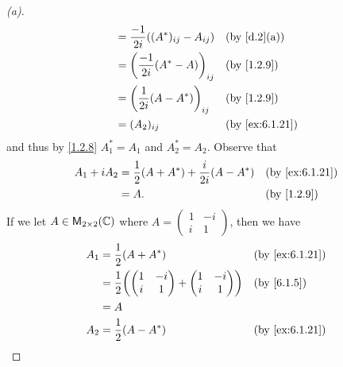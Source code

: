 \begin{proof}[(a)]
\begin{align*}
                                                      & = \frac{-1}{2i} ((A^*)_{i j} - A_{i j})               &  & \text{(by \cref{d.2}(a))}    \\
                                                      & = \pa{\frac{-1}{2i} (A^* - A)}_{i j}                  &  & \text{(by \cref{1.2.9})}     \\
                                                      & = \pa{\frac{1}{2i} (A - A^*)}_{i j}                   &  & \text{(by \cref{1.2.9})}     \\
                                                      & = (A_2)_{i j}                                         &  & \text{(by \cref{ex:6.1.21})}
  \end{align*}
  and thus by \cref{1.2.8} \(A_1^* = A_1\) and \(A_2^* = A_2\).
  Observe that
  \begin{align*}
    A_1 + i A_2 & = \frac{1}{2} (A + A^*) + \frac{i}{2i} (A - A^*) &  & \text{(by \cref{ex:6.1.21})} \\
                & = A.                                             &  & \text{(by \cref{1.2.9})}
  \end{align*}
  If we let \(A \in \mathsf{M}_{{2} \times 2}({\mathbb{C}})\) where \(A = \begin{pmatrix}
    1 & -i \\
    i & 1
  \end{pmatrix}\), then we have
  \begin{align*}
    A_1          & = \frac{1}{2} (A + A^*)           &  & \text{(by \cref{ex:6.1.21})}            \\
                 & = \frac{1}{2} \pa{\begin{pmatrix}
                                         1 & -i \\
                                         i & 1
                                       \end{pmatrix} + \begin{pmatrix}
                                                         1 & -i \\
                                                         i & 1
                                                       \end{pmatrix}} &  & \text{(by \cref{6.1.5})} \\
                 & = A                                                                            \\
    A_2          & = \frac{1}{2} (A - A^*)           &  & \text{(by \cref{ex:6.1.21})}            \\

\end{align*}
\end{proof}
